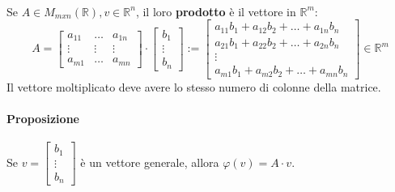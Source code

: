 \documentclass[a4paper, 12pt]{report}
\begin{document}
            \paragraph{}Se $A \in M_{mxn}(\mathbb{R}), v \in \mathbb{R}^n$, il loro \textbf{prodotto} è il vettore in $\mathbb{R}^m$:
            $$
            A=
            \begin{bmatrix}
                a_{11} & \dots & a_{1n}\\
                \vdots & \vdots & \vdots\\
                a_{m1} & \dots & a_{mn}
            \end{bmatrix}
            \cdot 
            \begin{bmatrix}
                b_1\\
                \vdots\\
                b_n
            \end{bmatrix}
            :=
            \begin{bmatrix}
                a_{11}b_1+a_{12}b_2+\dots+a_{1n}b_n\\
                a_{21}b_1+a_{22}b_2+\dots+a_{2n}b_n\\
                \vdots\\
                a_{m1}b_1+a_{m2}b_2+\dots+a_{mn}b_n
            \end{bmatrix}
            \in \mathbb{R}^m
            $$
            Il vettore moltiplicato deve avere lo stesso numero di colonne della matrice.
            \paragraph{Proposizione} Se $v=
            \begin{bmatrix}
                b_1\\
                \vdots\\
                b_n
            \end{bmatrix}
            $
            è un vettore generale, allora $\varphi(v)=A\cdot v$.
\end{document}
